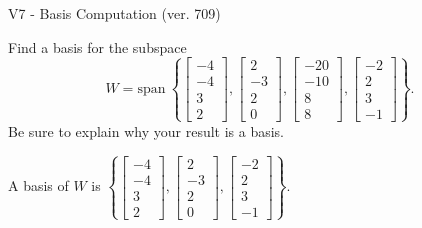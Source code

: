 \begin{exercise}
  \begin{exerciseTitle}V7 - Basis Computation (ver. 709)\end{exerciseTitle}
  \begin{exerciseStatement}
    Find a basis for the subspace 
\[W=\mathrm{span}\ \left\{\left[\begin{array}{r}
-4 \\
-4 \\
3 \\
2
\end{array}\right] , \left[\begin{array}{r}
2 \\
-3 \\
2 \\
0
\end{array}\right] , \left[\begin{array}{r}
-20 \\
-10 \\
8 \\
8
\end{array}\right] , \left[\begin{array}{r}
-2 \\
2 \\
3 \\
-1
\end{array}\right]\right\}.\]
 Be sure to explain why your result is a basis.


  \end{exerciseStatement}
  \begin{exerciseAnswer}
   A basis of \(W\) is  \(\left\{\left[\begin{array}{r}
-4 \\
-4 \\
3 \\
2
\end{array}\right] , \left[\begin{array}{r}
2 \\
-3 \\
2 \\
0
\end{array}\right] , \left[\begin{array}{r}
-2 \\
2 \\
3 \\
-1
\end{array}\right]\right\}\).
  


  \end{exerciseAnswer}
\end{exercise}